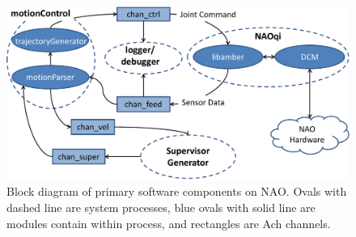 \begin{figure}
  \includegraphics[width=.5\textwidth]{fig/naoprogram}
  \caption{Block diagram of primary software components on NAO.
  Ovals with dashed line are system processes, blue ovals with solid
line are modules contain within process, and rectangles are Ach channels.}
  \label{fig:naoprogram}
  \vspace{-2.0em}
\end{figure}

